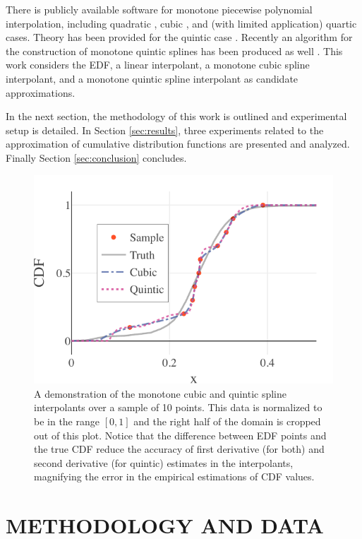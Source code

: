 \documentclass[letterpaper, 10 pt, conference]{IEEEtran}  %
\begin{document}
There is publicly available software for monotone piecewise polynomial interpolation, including quadratic \cite{he1998monotone}, cubic \cite{fritsch1980monotone}, and (with limited application) quartic \cite{wang2004rational,piah2011improved,yao2018unconditionally} cases. Theory has been provided for the quintic case \cite{ulrich1994positivity,hess1994positive}. Recently an algorithm for the construction of monotone quintic splines has been produced as well \cite{lux2020algorithm}.
This work considers the EDF, a linear interpolant, a monotone cubic spline interpolant, and a monotone quintic spline interpolant as candidate approximations.

In the next section, the methodology of this work is outlined and experimental setup is detailed. In Section \ref{sec:results}, three experiments related to the approximation of cumulative distribution functions are presented and analyzed. Finally Section \ref{sec:conclusion} concludes.


\begin{figure}
  \vspace{-.3cm}
  \includegraphics[width=.5\textwidth]{cq-sample-prediction.pdf}
  \caption{A demonstration of the monotone cubic and quintic spline interpolants over a sample of 10 points. This data is normalized to be in the range $[0,1]$ and the right half of the domain is cropped out of this plot. Notice that the difference between EDF points and the true CDF reduce the accuracy of first derivative (for both) and second derivative (for quintic) estimates in the interpolants, magnifying the error in the empirical estimations of CDF values.
  }
  \label{fig:sample-prediction}
\end{figure}

\section{METHODOLOGY AND DATA}
\label{sec:methodology}
\end{document}
